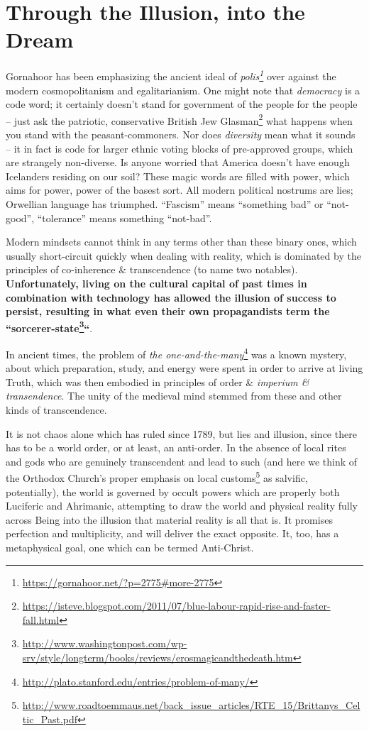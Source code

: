 \section{Through the Illusion, into the Dream}

Gornahoor has been emphasizing the ancient ideal of \emph{polis\footnote{\url{https://gornahoor.net/?p=2775\#more-2775}}} over against the modern cosmopolitanism and egalitarianism. One might note that \emph{democracy} is a code word; it certainly doesn't stand for government of the people for the people -- just ask the patriotic, conservative British Jew Glasman\footnote{\url{https://isteve.blogspot.com/2011/07/blue-labour-rapid-rise-and-faster-fall.html}} what happens when you stand with the peasant-commoners. Nor does \emph{diversity} mean what it sounds -- it in fact is code for larger ethnic voting blocks of pre-approved groups, which are strangely non-diverse. Is anyone worried that America doesn't have enough Icelanders residing on our soil? These magic words are filled with power, which aims for power, power of the basest sort. All modern political nostrums are lies; Orwellian language has triumphed. ``Fascism'' means ``something bad'' or ``not-good'', ``tolerance'' means something ``not-bad''.

Modern mindsets cannot think in any terms other than these binary ones, which usually short-circuit quickly when dealing with reality, which is dominated by the principles of co-inherence \& transcendence (to name two notables). \textbf{Unfortunately, living on the cultural capital of past times in combination with technology has allowed the illusion of success to persist, resulting in what even their own propagandists term the ``sorcerer-state\footnote{\url{http://www.washingtonpost.com/wp-srv/style/longterm/books/reviews/erosmagicandthedeath.htm}}``}.

In ancient times, the problem of \emph{the one-and-the-many}\footnote{\url{http://plato.stanford.edu/entries/problem-of-many/}} was a known mystery, about which preparation, study, and energy were spent in order to arrive at living Truth, which was then embodied in principles of order \& \emph{imperium \& transendence}. The unity of the medieval mind stemmed from these and other kinds of transcendence.

It is not chaos alone which has ruled since 1789, but lies and illusion, since there has to be a world order, or at least, an anti-order. In the absence of local rites and gods who are genuinely transcendent and lead to such (and here we think of the Orthodox Church's proper emphasis on local customs\footnote{\url{http://www.roadtoemmaus.net/back\_issue\_articles/RTE\_15/Brittanys\_Celtic\_Past.pdf}} as salvific, potentially), the world is governed by occult powers which are properly both Luciferic and Ahrimanic, attempting to draw the world and physical reality fully across Being into the illusion that material reality is all that is. It promises perfection and multiplicity, and will deliver the exact opposite. It, too, has a metaphysical goal, one which can be termed Anti-Christ.

